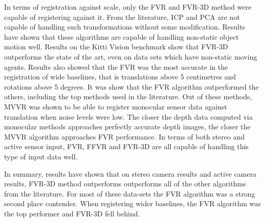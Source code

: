 In terms of registration against scale, only the FVR and FVR-3D method were capable of registering against it. From the literature, ICP and PCA are not capable of handling such transformations without some modification. Results have shown that these algorithms are capable of handling non-static object motion well. Results on the Kitti Vision benchmark show that FVR-3D outperforms the state of the art, even on data sets which have non-static moving agents. Results also showed that the FVR was the most accurate in the registration of wide baselines, that is translations above 5 centimetres and rotations above 5 degrees. It was show that the FVR algorithm outperformed the others, including the top methods used in the literature. Out of these methods, MVVR was shown to be able to register monocular sensor data against translation when noise levels were low. The closer the depth data computed via monocular methods approaches perfectly accurate depth images, the closer the MVVR algorithm approaches FVR performance. In terms of both stereo and active sensor input, FVR, FFVR and FVR-3D are all capable of handling this type of input data well. \\


\begin{table}[h]
\caption{FVR Comparison Table \label{tab:GridRT}}
\end{table}


In summary, results have shown that on stereo camera results and active camera results, FVR-3D method outperforms outperforms all of the other algorithms from the literature. For most of these data-sets the FVR algorithm was a strong second place contender. When registering wider baselines, the FVR algorithm was the top performer and FVR-3D fell behind.

